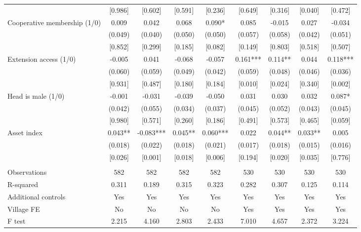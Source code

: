 \documentclass[]{article}
\begin{document}
\begin{tabular}{lcccccccc}
 & [0.986] & [0.602] & [0.591] & [0.236] & [0.649] & [0.316] & [0.040] & [0.472] \\
Cooperative membership (1/0) & 0.009 & 0.042 & 0.068 & 0.090* & 0.085 & -0.015 & 0.027 & -0.034 \\
 & (0.049) & (0.040) & (0.050) & (0.050) & (0.057) & (0.058) & (0.042) & (0.051) \\
 & [0.852] & [0.299] & [0.185] & [0.082] & [0.149] & [0.803] & [0.518] & [0.507] \\
Extension access (1/0) & -0.005 & 0.041 & -0.068 & -0.057 & 0.161*** & 0.114** & 0.044 & 0.118*** \\
 & (0.060) & (0.059) & (0.049) & (0.042) & (0.059) & (0.048) & (0.046) & (0.036) \\
 & [0.931] & [0.487] & [0.180] & [0.184] & [0.010] & [0.024] & [0.340] & [0.002] \\
Head is male (1/0) & -0.001 & -0.031 & -0.039 & -0.050 & 0.031 & 0.030 & 0.032 & 0.087* \\
 & (0.042) & (0.055) & (0.034) & (0.037) & (0.045) & (0.052) & (0.043) & (0.045) \\
 & [0.980] & [0.571] & [0.260] & [0.186] & [0.491] & [0.573] & [0.465] & [0.059] \\
Asset index & 0.043** & -0.083*** & 0.045** & 0.060*** & 0.022 & 0.044** & 0.033** & 0.005 \\
 & (0.018) & (0.022) & (0.018) & (0.021) & (0.017) & (0.018) & (0.015) & (0.016) \\
 & [0.026] & [0.001] & [0.018] & [0.006] & [0.194] & [0.020] & [0.035] & [0.776] \\
 &  &  &  &  &  &  &  &  \\
Observations & 582 & 582 & 582 & 582 & 530 & 530 & 530 & 530 \\
R-squared & 0.311 & 0.189 & 0.315 & 0.323 & 0.282 & 0.307 & 0.125 & 0.114 \\
Additional controls & Yes & Yes & Yes & Yes & Yes & Yes & Yes & Yes \\
Village FE & No & No & No & No & Yes & Yes & Yes & Yes \\
 F test & 2.215 & 4.160 & 2.803 & 2.433 & 7.010 & 4.657 & 2.372 & 3.224 \\ \hline
\end{tabular}
\end{document}
